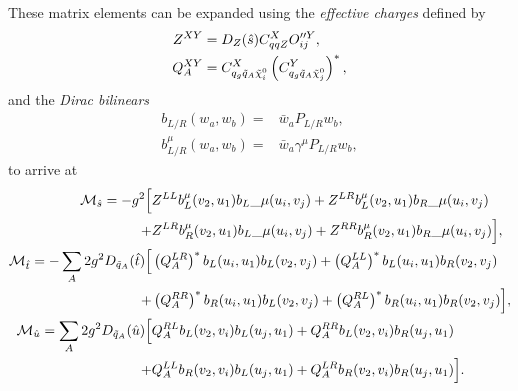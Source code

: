 \documentclass[../main.tex]{subfiles}
\begin{document}
These matrix elements can be expanded using the \textit{effective charges} defined by
\begin{subequations}
  \label{pc:eq:eff_charges}
  \begin{align}
    Z^{XY}   & = D_Z(\hat{s}) C_{qqZ}^X O_{ij}^{\prime\prime Y},                                   \\
    Q_A^{XY} & = C_{q_g \tilde{q}_A \nino[i]}^{X} \pclosed{C_{q_g \tilde{q}_A \nino[j]}^{Y}}^\ast,
  \end{align}
\end{subequations}
and the \emph{Dirac bilinears}
\begin{subequations}
  \begin{align}
    b_{L/R}(w_a, w_b) =     & \bar{w}_a P_{L/R} w_b,            \\
    b_{L/R}^\mu(w_a, w_b) = & \bar{w}_a \gamma^\mu P_{L/R} w_b,
  \end{align}
\end{subequations}
to arrive at
\begin{subequations}
  \label{pc:eq:MLO}
  \begin{align}
    \nonumber
    \M_{\hat{s}} = -g^2 \Big[                                  &
    Z^{LL} b_L^\mu(v_2, u_1){b_L}\_{\mu}(u_i, v_j) + Z^{LR} b_L^\mu(v_2, u_1){b_R}\_{\mu}(u_i, v_j)                 \\
    +                                                          & Z^{LR} b_{R}^\mu(v_2, u_1){b_L}\_{\mu}(u_i, v_j) +
    Z^{RR} b_R^\mu(v_2, u_1){b_R}\_{\mu}(u_i, v_j) \Big],                                                           \\
    \nonumber
    \M_{\hat{t}} = -\sum_A 2g^2 D_{\tilde{q}_A}(\hat{t}) \Big[ &
    \pclosed{Q_A^{LR}}^\ast b_L(u_i, u_1) b_L(v_2, v_j) +
    \pclosed{Q_A^{LL}}^\ast
    b_L(u_i, u_1) b_R(v_2, v_j)                                                                                     \\
    +                                                          &
    \pclosed{Q_A^{RR}}^\ast b_R(u_i, u_1) b_L(v_2, v_j) +
    \pclosed{Q_A^{RL}}^\ast
    b_R(u_i, u_1) b_R(v_2, v_j) \Big],                                                                              \\
    \nonumber
    \M_{\hat{u}} = \sum_A 2g^2 D_{\tilde{q}_A}(\hat{u}) \Big[  &
    Q_A^{RL} b_L(v_2, v_i) b_L(u_j, u_1) + Q_A^{RR} b_L(v_2, v_i)
    b_R(u_j, u_1)
    \\
    +                                                          &
    Q_A^{LL} b_R(v_2, v_i) b_L(u_j, u_1) + Q_A^{LR} b_R(v_2, v_i)
    b_R(u_j, u_1)
    \Big].
  \end{align}
\end{subequations}
\end{document}
